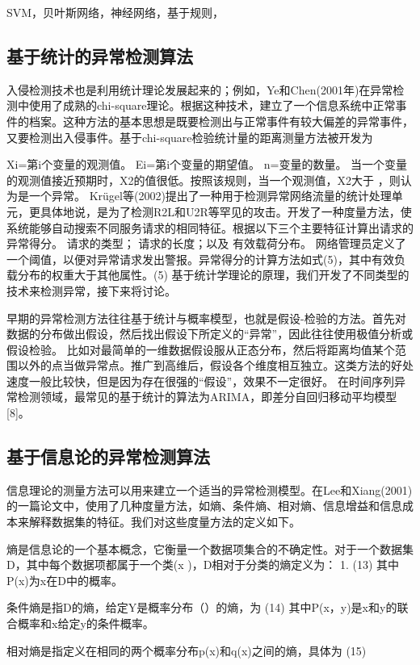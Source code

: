 SVM，贝叶斯网络，神经网络，基于规则，
\subsection{基于统计的异常检测算法}

入侵检测技术也是利用统计理论发展起来的；例如，Ye和Chen(2001年)在异常检测中使用了成熟的chi-square理论。根据这种技术，建立了一个信息系统中正常事件的档案。这种方法的基本思想是既要检测出与正常事件有较大偏差的异常事件，又要检测出入侵事件。基于chi-square检验统计量的距离测量方法被开发为

Xi=第i个变量的观测值。
Ei=第i个变量的期望值。
n=变量的数量。
当一个变量的观测值接近预期时，X2的值很低。按照该规则，当一个观测值，X2大于 ，则认为是一个异常。
Krügel等(2002)提出了一种用于检测异常网络流量的统计处理单元，更具体地说，是为了检测R2L和U2R等罕见的攻击。开发了一种度量方法，使系统能够自动搜索不同服务请求的相同特征。根据以下三个主要特征计算出请求的异常得分。
请求的类型；
请求的长度；以及
有效载荷分布。
网络管理员定义了一个阈值，以便对异常请求发出警报。异常得分的计算方法如式(5)，其中有效负载分布的权重大于其他属性。(5)
基于统计学理论的原理，我们开发了不同类型的技术来检测异常，接下来将讨论。


早期的异常检测方法往往基于统计与概率模型，也就是假设-检验的方法。首先对数据的分布做出假设，然后找出假设下所定义的“异常”，因此往往使用极值分析或假设检验。
比如对最简单的一维数据假设服从正态分布，然后将距离均值某个范围以外的点当做异常点。推广到高维后，假设各个维度相互独立。这类方法的好处速度一般比较快，但是因为存在很强的“假设”，效果不一定很好。
在时间序列异常检测领域，最常见的基于统计的算法为ARIMA，即差分自回归移动平均模型[8]。

\subsection{基于信息论的异常检测算法}

信息理论的测量方法可以用来建立一个适当的异常检测模型。在Lee和Xiang(2001)的一篇论文中，使用了几种度量方法，如熵、条件熵、相对熵、信息增益和信息成本来解释数据集的特征。我们对这些度量方法的定义如下。

熵是信息论的一个基本概念，它衡量一个数据项集合的不确定性。对于一个数据集D，其中每个数据项都属于一个类(x )，D相对于分类的熵定义为： 1.
(13)
其中P(x)为x在D中的概率。


条件熵是指D的熵，给定Y是概率分布（）的熵，为
(14)
其中P(x，y)是x和y的联合概率和x给定y的条件概率。


相对熵是指定义在相同的两个概率分布p(x)和q(x)之间的熵，具体为
(15)

